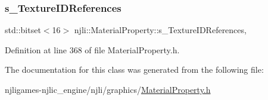 \subsubsection{\texorpdfstring{s\+\_\+\+Texture\+I\+D\+References}{s\_TextureIDReferences}}
{\footnotesize\ttfamily std\+::bitset$<$16$>$ njli\+::\+Material\+Property\+::s\+\_\+\+Texture\+I\+D\+References\hspace{0.3cm}{\ttfamily [static]}, {\ttfamily [private]}}



Definition at line 368 of file Material\+Property.\+h.



The documentation for this class was generated from the following file\+:\begin{DoxyCompactItemize}
\item 
njligames-\/njlic\+\_\+engine/njli/graphics/\mbox{\hyperlink{_material_property_8h}{Material\+Property.\+h}}\end{DoxyCompactItemize}

